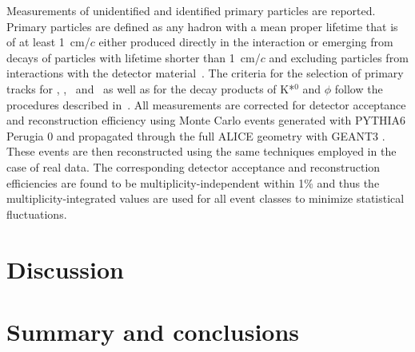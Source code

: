 \documentclass[ALICE,manyauthors]{cernphprep}
\begin{document}
Measurements of unidentified and identified primary particles are reported. Primary particles are defined as
any hadron with a mean proper lifetime that is of at least 1~cm/$c$ either produced directly in the interaction or emerging from decays of particles with lifetime shorter than 1~cm/$c$ and excluding particles from interactions with the detector material~\cite{ALICE-PUBLIC-2017-005}. The criteria for the selection of primary tracks for \pipm, \kapm, \p\ and \pbar\ as well as for the decay products of K*$^{0}$ and $\phi$ follow the  procedures described in~\cite{Adam:2015qaa}.
All measurements  are corrected for detector acceptance and  reconstruction efficiency using Monte Carlo events generated 
with PYTHIA6 Perugia 0 \cite{Sjostrand:2006za,Skands:2010ak} and propagated through the full ALICE geometry with 
GEANT3 \cite{Geant:1994zzo}. These events are then reconstructed using the same techniques employed in the case of real data. 
The corresponding detector acceptance and reconstruction efficiencies are found to be multiplicity-independent within 1\%
and thus the multiplicity-integrated values are used for all event classes to minimize statistical fluctuations. 


















\section{\label{secDiscussion}Discussion}







\section{\label{secConclusion} Summary and conclusions}
\end{document}
